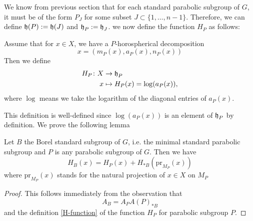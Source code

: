 We know from previous section that for each standard parabolic subgroup of $G$, it must be of the form
$P_J$ for some subset $J \subset \{1,\ldots,n-1\}$. Therefore, we can define $\operatorname{\mathfrak{h}}(P):= \operatorname{\mathfrak{h}}(J)$ and $
    \operatorname{\mathfrak{h}}_P:= \operatorname{\mathfrak{h}}_J$. we now define the function $H_P$ as follows:
\begin{definition}\label{H-function}
    Assume that for $x \in X$,
    we have a $P$-horospherical decomposition
    \[x = (m_P(x),a_P(x),n_P(x))\]
    Then we define
    \begin{align*}
        H_P \colon X & \to \operatorname{\mathfrak{h}}_P                      \\
        x            & \mapsto H_P(x) = \log(a_P(x)),
    \end{align*}
    where $\log$ means we  take the logarithm of the diagonal entries of $a_P(x)$.
\end{definition}
This definition is well-defined since $\log(a_P(x))$ is an element of $\operatorname{\mathfrak{h}}_P$ by definition.
We prove the following lemma
\begin{lemma}\label{H_P-decomp}
    Let $B$ the Borel standard subgroup of $G$, i.e. the minimal standard parabolic subgroup and $P$ is any parabolic subgroup of $G$.
    Then we have
    \[H_B(x) = H_P(x)+ H_{\ast B}(\text{pr}_{M_P}(x))\]
    where $\text{pr}_{M_P}(x)$ stands for the natural projection of $x \in X$ on $M_P$
\end{lemma}
\begin{proof}
    This follows immediately from the observation that
    \[A_B = A_PA(P)_{\ast B}\]
    and the definition \ref{H-function} of the function $H_P$ for parabolic subgroup $P$.
\end{proof}


